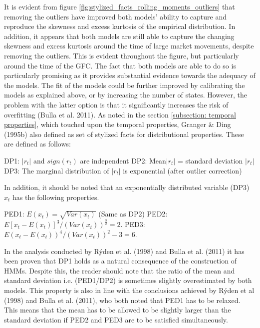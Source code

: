 It is evident from figure \ref{fig:stylized_facts_rolling_moments_outliers} that removing the outliers have improved both models' ability to capture and reproduce the skewness and excess kurtosis of the empirical distribution. In addition, it appears that both models are still able to capture the changing skewness and excess kurtosis around the time of large market movements, despite removing the outliers. This is evident throughout the figure, but particularly around the time of the GFC. The fact that both models are able to do so is particularly promising as it provides substantial evidence towards the adequacy of the models. The fit of the models could be further improved by calibrating the models as explained above, or by increasing the number of states. However, the problem with the latter option is that it significantly increases the risk of overfitting (Bulla et al. 2011). As noted in the section \ref{subsection: temporal properties}, which touched upon the temporal properties, Granger \& Ding (1995b) also defined as set of stylized facts for distributional properties. These are defined as follows:

DP1: $|r_t|$ and $sign(r_t)$ are independent\newline
DP2: Mean$|r_t|$ = standard deviation $|r_t|$ \newline
DP3: The marginal distribution of $|r_t|$ is exponential (after outlier correction)

In addition, it should be noted that an exponentially distributed variable (DP3) $x_t$ has the following properties.

PED1: $E(x_t) = \sqrt{Var(x_t)}$ (Same as DP2) \newline
PED2: $E[x_t-E(x_t)]^3 / (Var(x_t))^{\frac{3}{2}} = 2.$ \newline
PED3: $E(x_t-E(x_t))^4 / (Var(x_t))^{2} -3 = 6.$

In the analysis conducted by Rýden et al. (1998) and Bulla et al. (2011) it has been proven that DP1 holds as a natural consequence of the construction of HMMs. Despite this, the reader should note that the ratio of the mean and standard deviation i.e. (PED1/DP2) is sometimes slightly overestimated by both models. This property is also in line with the conclusions achieved by Rýden et al (1998) and Bulla et al. (2011), who both noted that PED1 has to be relaxed. This means that the mean has to be allowed to be slightly larger than the standard deviation if PED2 and PED3 are to be satisfied simultaneously.


